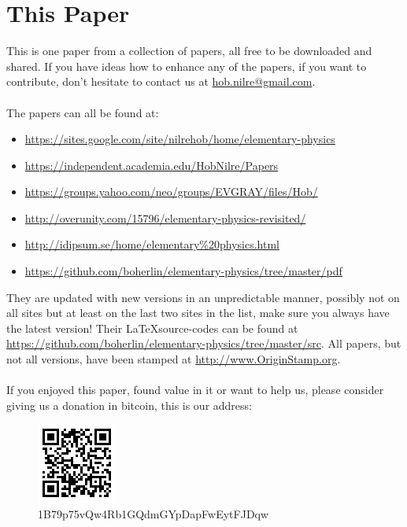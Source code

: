 \section{This Paper}

This is one paper from a collection of papers, all free to be downloaded and shared. If you have ideas how to enhance any of the papers, if you want to contribute, don’t hesitate to contact us at \url{hob.nilre@gmail.com}.\\
\\
The papers can all be found at:
\begin{itemize}
\item \url{https://sites.google.com/site/nilrehob/home/elementary-physics}
\item \url{https://independent.academia.edu/HobNilre/Papers}
\item \url{https://groups.yahoo.com/neo/groups/EVGRAY/files/Hob/}
\item \url{http://overunity.com/15796/elementary-physics-revisited/}
\item \url{http://idipsum.se/home/elementary%20physics.html}
\item \url{https://github.com/boherlin/elementary-physics/tree/master/pdf}
\end{itemize}

They are updated with new versions in an unpredictable manner, possibly not on all sites but at least on the last two sites in the list, make sure you always have the latest version!
Their \LaTeX source-codes can be found at \url{https://github.com/boherlin/elementary-physics/tree/master/src}.
All papers, but not all versions, have been stamped at \url{http://www.OriginStamp.org}.\\
\\
If you enjoyed this paper, found value in it or want to help us, please consider giving us a donation in bitcoin, this is our address:

\begin{figure}[ht] \centering
	\includegraphics[]{../common/1B79p75vQw4Rb1GQdmGYpDapFwEytFJDqw} \caption{1B79p75vQw4Rb1GQdmGYpDapFwEytFJDqw}
\end{figure}

